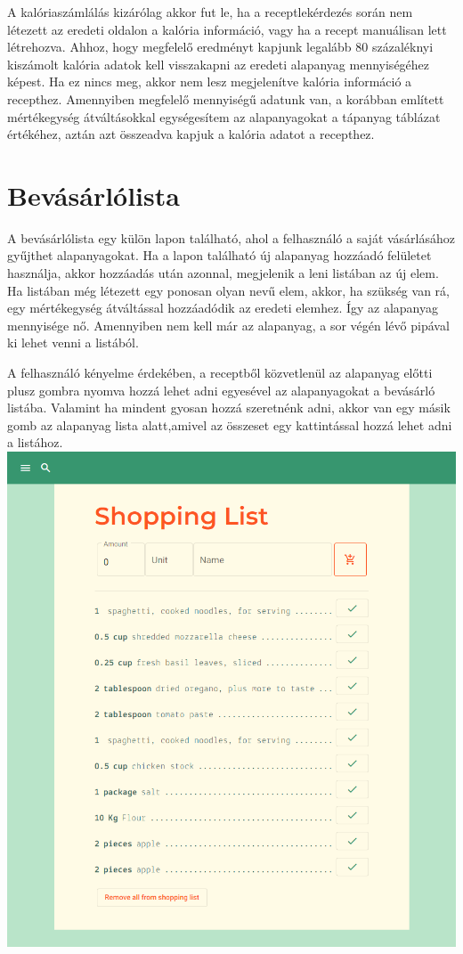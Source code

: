 \documentclass[12pt]{report}
\theoremstyle{definition}
\begin{document}
A kalóriaszámlálás kizárólag akkor fut le, ha a receptlekérdezés során nem létezett az eredeti oldalon a kalória információ, vagy ha a recept manuálisan lett létrehozva. Ahhoz, hogy megfelelő eredményt kapjunk legalább 80 százaléknyi kiszámolt kalória adatok kell visszakapni az eredeti alapanyag mennyiségéhez képest. Ha ez nincs meg, akkor nem lesz megjelenítve kalória információ a recepthez. Amennyiben megfelelő mennyiségű adatunk van, a korábban említett mértékegység átváltásokkal egységesítem az alapanyagokat a tápanyag táblázat értékéhez, aztán azt összeadva kapjuk a kalória adatot a recepthez.

\section{Bevásárlólista}
A bevásárlólista egy külön lapon található, ahol a felhasználó a saját vásárlásához gyűjthet alapanyagokat. Ha a lapon található új alapanyag hozzáadó felületet használja, akkor hozzáadás után azonnal, megjelenik a leni listában az új elem. Ha  listában még létezett egy ponosan olyan nevű elem, akkor, ha szükség van rá, egy mértékegység átváltással hozzáadódik az eredeti elemhez. Így az alapanyag mennyisége nő. Amennyiben nem kell már az alapanyag, a sor végén lévő pipával ki lehet venni a listából.

A felhasználó kényelme érdekében, a receptből közvetlenül az alapanyag előtti plusz gombra nyomva hozzá lehet adni egyesével az alapanyagokat a bevásárló listába. Valamint ha mindent gyosan hozzá szeretnénk adni, akkor van egy másik gomb az alapanyag lista alatt,amivel az összeset egy kattintással hozzá lehet adni a listához.\\

\noindent
\includegraphics[scale=0.4]{pictures/web_shoppinglist.png}
\end{document}
